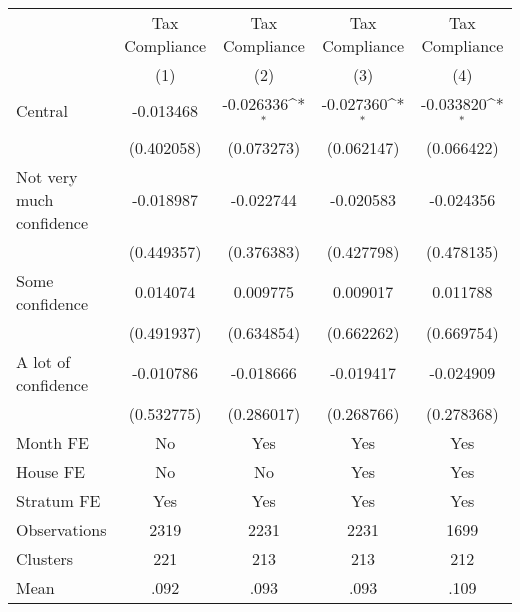 {
\def\sym#1{\ifmmode^{#1}\else\(^{#1}\)\fi}
\begin{tabular}{l*{4}{c}}
\toprule
                &\multicolumn{1}{c}{Tax Compliance}&\multicolumn{1}{c}{Tax Compliance}&\multicolumn{1}{c}{Tax Compliance}&\multicolumn{1}{c}{Tax Compliance}\\
                &\multicolumn{1}{c}{(1)}         &\multicolumn{1}{c}{(2)}         &\multicolumn{1}{c}{(3)}         &\multicolumn{1}{c}{(4)}         \\
\midrule
Central         &-0.013468         &-0.026336\sym{*}  &-0.027360\sym{*}  &-0.033820\sym{*}  \\
                &(0.402058)         &(0.073273)         &(0.062147)         &(0.066422)         \\
Not very much confidence&-0.018987         &-0.022744         &-0.020583         &-0.024356         \\
                &(0.449357)         &(0.376383)         &(0.427798)         &(0.478135)         \\
Some confidence & 0.014074         & 0.009775         & 0.009017         & 0.011788         \\
                &(0.491937)         &(0.634854)         &(0.662262)         &(0.669754)         \\
A lot of confidence&-0.010786         &-0.018666         &-0.019417         &-0.024909         \\
                &(0.532775)         &(0.286017)         &(0.268766)         &(0.278368)         \\
Month FE        &       No         &      Yes         &      Yes         &      Yes         \\
House FE        &       No         &       No         &      Yes         &      Yes         \\
Stratum FE      &      Yes         &      Yes         &      Yes         &      Yes         \\
\midrule
Observations    &     2319         &     2231         &     2231         &     1699         \\
Clusters        &      221         &      213         &      213         &      212         \\
Mean            &     .092         &     .093         &     .093         &     .109         \\
\bottomrule
\end{tabular}
}

